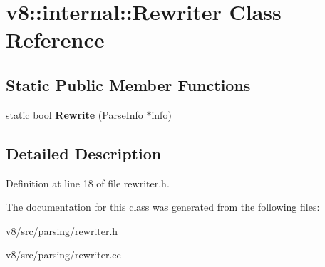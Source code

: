 \hypertarget{classv8_1_1internal_1_1Rewriter}{}\section{v8\+:\+:internal\+:\+:Rewriter Class Reference}
\label{classv8_1_1internal_1_1Rewriter}
\subsection*{Static Public Member Functions}
\begin{DoxyCompactItemize}
\item 
\mbox{\label{classv8_1_1internal_1_1Rewriter_a6988dcedbc6c2adadf310f7802ebd3ce}} 
static \mbox{\hyperlink{classbool}{bool}} {\bfseries Rewrite} (\mbox{\hyperlink{classv8_1_1internal_1_1ParseInfo}{Parse\+Info}} $\ast$info)
\end{DoxyCompactItemize}


\subsection{Detailed Description}


Definition at line 18 of file rewriter.\+h.



The documentation for this class was generated from the following files\+:\begin{DoxyCompactItemize}
\item 
v8/src/parsing/rewriter.\+h\item 
v8/src/parsing/rewriter.\+cc\end{DoxyCompactItemize}
